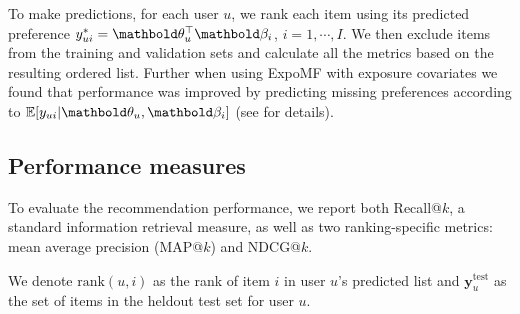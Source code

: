 To make predictions, for each user $u$, we rank each item using its predicted
preference ${y}^*_{ui} = \mb\theta_u^\top \mb\beta_i$, $i = 1, \cdots, I$.
We then exclude items from the training and validation sets and calculate all the
metrics based on the resulting ordered list. Further when using
ExpoMF with exposure covariates we found that performance was improved by predicting missing preferences
according to $\mathbb{E}[y_{ui}|\mb\theta_u,\mb\beta_i]$ (see  for details).

\subsection{Performance measures}

To evaluate the recommendation performance, we report both Recall@$k$, a standard
information retrieval measure, as well as two ranking-specific
metrics: mean average precision (MAP@$k$) and
NDCG@$k$.

We denote $\text{rank}(u, i)$ as the rank of item $i$ in user $u$'s
predicted list and $\mathbf{y}_u^{\text{test}}$ as the set of items in the
heldout test set for user $u$.


